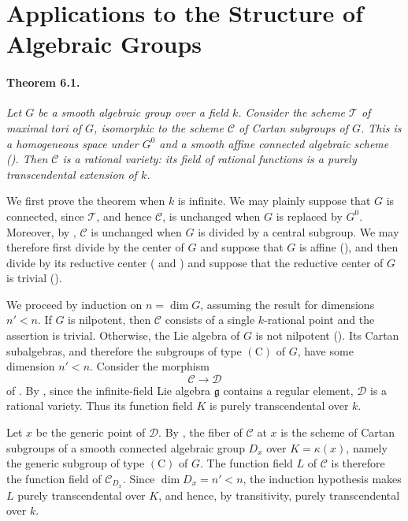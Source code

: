 
\section{Applications to the Structure of Algebraic Groups}

\paragraph{\textbf{Theorem 6.1.}}
{\itshape Let \(G\) be a smooth algebraic group over a field
\(k\). Consider the scheme \(\mathcal T\) of maximal tori of
\(G\), isomorphic to the scheme \(\mathcal C\) of Cartan
subgroups of \(G\). This is a homogeneous space under \(G^0\) and
a smooth affine connected algebraic scheme
\textup{(\textup{})}. Then \(\mathcal C\) is a rational
variety: its field of rational functions is a purely
transcendental extension of \(k\).}

We first prove the theorem when \(k\) is infinite. We may plainly
suppose that \(G\) is connected, since \(\mathcal T\), and hence
\(\mathcal C\), is unchanged when \(G\) is replaced by \(G^0\).
Moreover, by , \(\mathcal C\) is unchanged when \(G\) is
divided by a central subgroup. We may therefore first divide by
the center of \(G\) and suppose that \(G\) is affine
\textup{()}, and then divide by its reductive center
\textup{( and )} and suppose that the reductive center
of \(G\) is trivial \textup{(\textup{})}.

We proceed by induction on \(n=\dim G\), assuming the result for
dimensions \(n'<n\). If \(G\) is nilpotent, then \(\mathcal C\)
consists of a single \(k\)-rational point and the assertion is
trivial. Otherwise, the Lie algebra of \(G\) is not nilpotent
\textup{()}. Its Cartan subalgebras, and therefore the
subgroups of type \((\mathrm C)\) of \(G\), have some dimension
\(n'<n\). Consider the morphism
\[
  \mathcal C\longrightarrow\mathcal D
\]
of . By , since the infinite-field Lie algebra
\(\mathfrak g\) contains a regular element, \(\mathcal D\) is a
rational variety. Thus its function field \(K\) is purely
transcendental over \(k\).

Let \(x\) be the generic point of \(\mathcal D\). By , the
fiber of \(\mathcal C\) at \(x\) is the scheme of Cartan
subgroups of a smooth connected algebraic group \(D_x\) over
\(K=\kappa(x)\), namely the generic subgroup of type
\((\mathrm C)\) of \(G\). The function field \(L\) of
\(\mathcal C\) is therefore the function field of
\(\mathcal C_{D_x}\). Since \(\dim D_x=n'<n\), the induction
hypothesis makes \(L\) purely transcendental over \(K\), and
hence, by transitivity, purely transcendental over \(k\).

